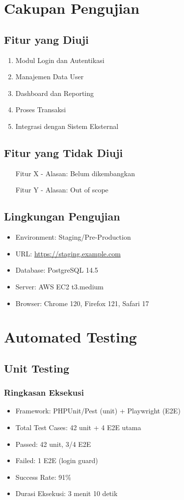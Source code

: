 \documentclass[12pt,a4paper]{article}
\begin{document}
\section{Cakupan Pengujian}
\subsection{Fitur yang Diuji}
\begin{enumerate}
  \item Modul Login dan Autentikasi
  \item Manajemen Data User
  \item Dashboard dan Reporting
  \item Proses Transaksi
  \item Integrasi dengan Sistem Eksternal
\end{enumerate}

\subsection{Fitur yang Tidak Diuji}
\begin{itemize}
  \item [Fitur X - Alasan: Belum dikembangkan]
  \item [Fitur Y - Alasan: Out of scope]
\end{itemize}

\subsection{Lingkungan Pengujian}
\begin{itemize}
  \item Environment: Staging/Pre-Production
  \item URL: \url{https://staging.example.com}
  \item Database: PostgreSQL 14.5
  \item Server: AWS EC2 t3.medium
  \item Browser: Chrome 120, Firefox 121, Safari 17
\end{itemize}

\section{Automated Testing}
\subsection{Unit Testing}
\subsubsection{Ringkasan Eksekusi}
\begin{itemize}
  \item Framework: PHPUnit/Pest (unit) + Playwright (E2E)
  \item Total Test Cases: 42 unit + 4 E2E utama
  \item Passed: 42 unit, 3/4 E2E
  \item Failed: 1 E2E (login guard)
  \item Success Rate: 91\%
  \item Durasi Eksekusi: 3 menit 10 detik
\end{itemize}
\end{document}
